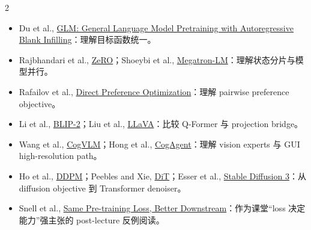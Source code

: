 \documentclass[a4paper]{article}
\begin{document}
\begin{multicols}{2}
\footnotesize
\begin{itemize}
  \setlength{\itemsep}{0.15em}
  \setlength{\parskip}{0pt}
  \item Du et al., \href{https://arxiv.org/abs/2103.10360}{GLM: General Language Model Pretraining with Autoregressive Blank Infilling}：理解目标函数统一。
  \item Rajbhandari et al., \href{https://arxiv.org/abs/1910.02054}{ZeRO}；Shoeybi et al., \href{https://arxiv.org/abs/1909.08053}{Megatron-LM}：理解状态分片与模型并行。
  \item Rafailov et al., \href{https://arxiv.org/abs/2305.18290}{Direct Preference Optimization}：理解 pairwise preference objective。
  \item Li et al., \href{https://arxiv.org/abs/2301.12597}{BLIP-2}；Liu et al., \href{https://arxiv.org/abs/2304.08485}{LLaVA}：比较 Q-Former 与 projection bridge。
  \item Wang et al., \href{https://arxiv.org/abs/2311.03079}{CogVLM}；Hong et al., \href{https://arxiv.org/abs/2312.08914}{CogAgent}：理解 vision experts 与 GUI high-resolution path。
  \item Ho et al., \href{https://arxiv.org/abs/2006.11239}{DDPM}；Peebles and Xie, \href{https://arxiv.org/abs/2212.09748}{DiT}；Esser et al., \href{https://arxiv.org/abs/2403.03206}{Stable Diffusion 3}：从 diffusion objective 到 Transformer denoiser。
  \item Snell et al., \href{https://arxiv.org/abs/2409.01236}{Same Pre-training Loss, Better Downstream}：作为课堂“loss 决定能力”强主张的 post-lecture 反例阅读。
\end{itemize}
\end{multicols}
\end{document}

